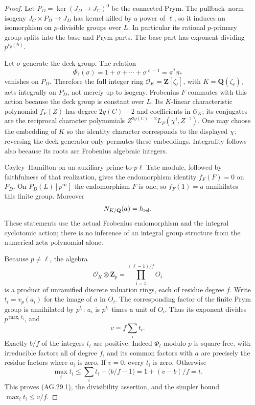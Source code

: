 \begin{proof}
Let $P_D=\ker(J_D\to J_C)^0$ be the connected Prym.
The pullback--norm isogeny
$J_C\times P_D\to J_D$ has kernel killed by a power
of $\ell$, so it induces an isomorphism on $p$-divisible
groups over $L$. In particular its rational $p$-primary
group splits into the base and Prym parts. The base part
has exponent dividing $p^{v_p(h)}$.

Let $\sigma$ generate the deck group. The relation
\[
 \Phi_\ell(\sigma)=1+\sigma+\cdots+\sigma^{\ell-1}
                       =\pi^*\pi_*
\]
vanishes on $P_D$. Therefore the full integer ring
$\mathcal O_K=\mathbf Z[\zeta_\ell]$, with
$K=\mathbf Q(\zeta_\ell)$, acts integrally on $P_D$,
not merely up to isogeny. Frobenius $F$ commutes with
this action because the deck group is constant over $L$.
Its $K$-linear characteristic polynomial $f_F(Z)$
has degree $2g(C)-2$ and coefficients in $\mathcal O_K$;
its conjugates are the reciprocal character polynomials
$Z^{2g(C)-2}L_P(\chi^i,Z^{-1})$. One may choose the
embedding of $K$ so the identity character corresponds
to the displayed $\chi$; reversing the deck generator
only permutes these embeddings. Integrality follows
also because its roots are Frobenius algebraic integers.

Cayley--Hamilton on an auxiliary prime-to-$p\ell$
Tate module, followed by faithfulness of that realization,
gives the endomorphism identity $f_F(F)=0$ on $P_D$.
On $P_D(L)[p^\infty]$ the endomorphism $F$ is one,
so $f_F(1)=a$ annihilates this finite group. Moreover
\[
                      N_{K/\mathbf Q}(a)=h_{\rm rel}.
\]
These statements use the actual Frobenius endomorphism
and the integral cyclotomic action; there is no inference
of an integral group structure from the numerical zeta
polynomial alone.

Because $p\ne\ell$, the algebra
\[
 \mathcal O_K\otimes\mathbf Z_p=\prod_{i=1}^{(\ell-1)/f}O_i
\]
is a product of unramified discrete valuation rings,
each of residue degree $f$. Write $t_i=v_p(a_i)$ for
the image of $a$ in $O_i$. The corresponding factor
of the finite Prym group is annihilated by $p^{t_i}$:
$a_i$ is $p^{t_i}$ times a unit of $O_i$.
Thus its exponent divides $p^{\max_i t_i}$, and
\[
                       v=f\sum_i t_i.
\]
Exactly $b/f$ of the integers $t_i$ are positive.
Indeed $\Phi_\ell$ modulo $p$ is square-free, with
irreducible factors all of degree $f$, and its common
factors with $a$ are precisely the residue factors
where $a_i$ is zero. If $v=0$, every $t_i$ is zero.
Otherwise
\[
 \max_i t_i\le\sum_i t_i-\bigl(b/f-1\bigr)
                         =1+(v-b)/f=t.
\]
This proves (AG.29.1), the divisibility assertion,
and the simpler bound $\max_i t_i\le v/f$.


\end{proof}
